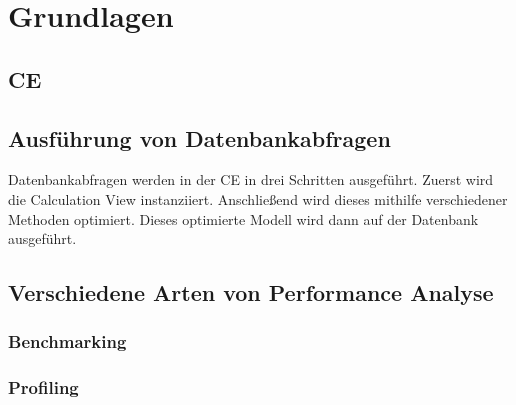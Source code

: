 \chapter{Grundlagen}
\section{\acl{CE}}
\section{Ausführung von Datenbankabfragen}
\label{sec:execution_of_db_queries}
Datenbankabfragen werden in der  \ac{CE} in drei Schritten ausgeführt. Zuerst
wird die Calculation View instanziiert. Anschließend wird dieses mithilfe
verschiedener Methoden optimiert. Dieses optimierte Modell wird dann auf der
Datenbank ausgeführt.
\section{Verschiedene Arten von Performance Analyse}
\label{sec:types_of_perf_analysis}
\subsection*{Benchmarking}
\subsection*{Profiling}
